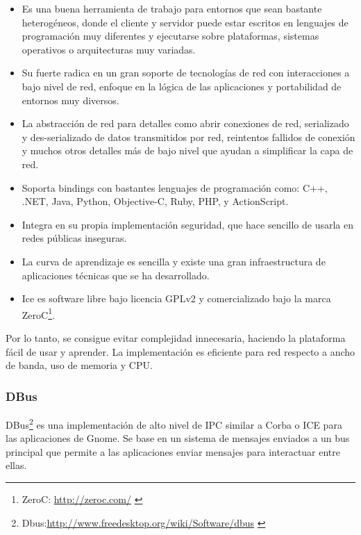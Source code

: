 \begin{itemize}    
    \item Es una buena herramienta de trabajo para entornos que sean
    bastante heterogéneos, donde el cliente y servidor puede estar escritos
    en lenguajes de programación muy diferentes y ejecutarse sobre
    plataformas, sistemas operativos o arquitecturas muy variadas.

    \item Su fuerte radica en un gran soporte de tecnologías de red
    con interacciones a bajo nivel de red, enfoque en la lógica de las
    aplicaciones y portabilidad de entornos muy diversos.

    \item La abstracción de red para detalles como abrir conexiones de red,
    serializado y des-serializado de datos transmitidos por red,
    reintentos fallidos de conexión y muchos otros detalles más de
    bajo nivel que ayudan a simplificar la capa de red\cite{Fou05}.

    \item Soporta bindings con bastantes lenguajes de programación como:
    C++, .NET, Java, Python\cite{Val06}, Objective-C, Ruby, PHP, y
    ActionScript.
    
    \item Integra en su propia implementación seguridad, que hace sencillo de
    usarla en redes públicas inseguras.

    \item La curva de aprendizaje\cite{Hen06} es sencilla y existe una gran
    infraestructura de aplicaciones técnicas que se ha desarrollado.
    
    \item Ice es software libre bajo licencia \acs{GPL}v2 y comercializado
    bajo la marca ZeroC\footnote{ZeroC: \url{http://zeroc.com/}
    \label{ftn:ZeroC}}.
\end{itemize}   

Por lo tanto, se consigue evitar complejidad innecesaria, haciendo la
plataforma fácil de usar y aprender. La implementación es eficiente
para red respecto a ancho de banda, uso de memoria y CPU.

\subsubsection{DBus}
\label{sec:DBus}

DBus\footnote{Dbus:\url{http://www.freedesktop.org/wiki/Software/dbus}
\label{ftn:DBus}} es una implementación de alto nivel de IPC similar a 
Corba o ICE para las aplicaciones de Gnome. Se base en un sistema de
mensajes enviados a un bus principal que permite a las aplicaciones enviar
mensajes para interactuar entre ellas.

